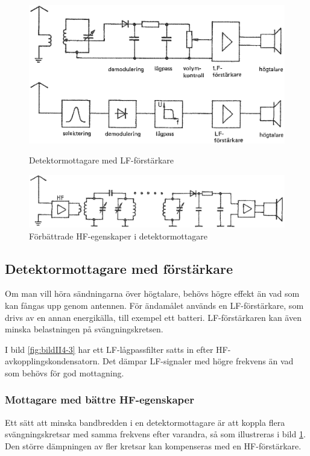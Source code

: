 \begin{figure}
  \includegraphics[width=\textwidth]{images/cropped_pdfs/bild_2_4-03.pdf}
  \caption{Detektormottagare med LF-förstärkare}
  \label{fig:bildII4-3}

  \includegraphics[width=\textwidth]{images/cropped_pdfs/bild_2_4-05.pdf}
  \caption{Förbättrade HF-egenskaper i detektormottagare}
  \label{fig:bildII4-5}
\end{figure}

\subsection{Detektormottagare med förstärkare}

Om man vill höra sändningarna över högtalare, behövs högre effekt än
vad som kan fångas upp genom antennen.
För ändamålet används en LF-förstärkare, som drivs av en annan energikälla,
till exempel ett batteri.
LF-förstärkaren kan även minska belastningen på svängningskretsen.

I bild \ref{fig:bildII4-3} har ett LF-lågpassfilter satts in efter
HF-avkopplingskondensatorn.
Det dämpar LF-signaler med högre frekvens än vad som behövs för god mottagning.

\subsubsection{Mottagare med bättre HF-egenskaper}

Ett sätt att minska bandbredden i en detektormottagare är att koppla
flera svängningskretsar med samma frekvens efter varandra, så som illustreras
i bild \ref{fig:bildII4-5}.
Den större dämpningen av fler kretsar kan kompenseras med en HF-förstärkare.

